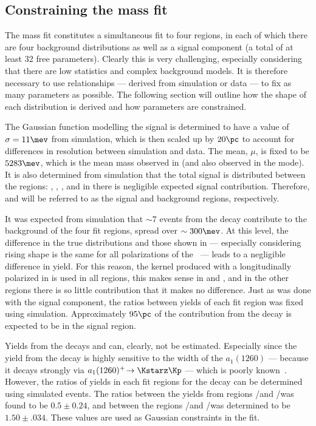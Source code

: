 \subsection{Constraining the mass fit}
The mass fit constitutes a simultaneous fit to four regions, in each of which there are four
background distributions as well as a signal component (a total of at least 32 free parameters).
Clearly this is very challenging, especially considering that there are low statistics and complex
background models.
It is therefore necessary to use relationships --- derived from simulation or data --- to fix as
many parameters as possible.
The following section will outline how the shape of each distribution is derived and how
parameters are constrained.

The Gaussian function modelling the signal is determined to have
a value of $\sigma=11\mev$ from simulation, which is then scaled up by
$20\pc$ to account for differences in resolution between simulation and data.
The mean, $\mu$, is fixed to be $5283\mev$, which is the mean mass observed in
\decay{\Bp}{\Dz\pip} (and also observed in the \Bs mode).
It is also determined from simulation that the total signal is distributed between the regions:
\pc, \pc, \pc, and in \rD there is negligible expected signal contribution.
Therefore, \rA and \rD will be referred to as the signal and background regions,
respectively.

It was expected from simulation that $\sim7$ events from the decay \btodsstrphi contribute to the
background of the four fit regions, spread over $\sim300\mev$.
At this level, the difference in the true distributions and those shown in 
--- especially considering rising shape is the same for all polarizations of the \phii\ ---
leads to a negligible difference in yield.
For this reason, the kernel produced with a longitudinally polarized \phii in \btodsstrphi
is used in all regions, this makes sense in \rA and \rB, and in the other regions there is so
little contribution that it makes no difference.
Just as was done with the signal component, the ratios between yields of each fit region was fixed
using simulation.
Approximately $95\pc$ of the contribution from the decay \btodsstrphi is expected to be in the
signal region.

Yields from the decays \bstodskstrk and \bstodsstrkstrk can, clearly, not be estimated.
Especially since the yield from the decay \bstodskstrk is highly sensitive to the width of the
$a_1(1260)$ --- because it decays strongly via $a_1(1260)^+\!\to\Kstarz\Kp$ --- which is poorly
known~\cite{PDG2012}.
However, the ratios of yields in each fit regions for the decay \bstodskstrk can be determined
using simulated events.
The ratios between the yields from regions \rA/\rB and \rC/\rD was found to be $0.5\pm0.24$, and
between the regions \rA/\rC and \rB/\rD was determined to be $1.50\pm.034$.
These values are used as Gaussian constraints in the fit.

